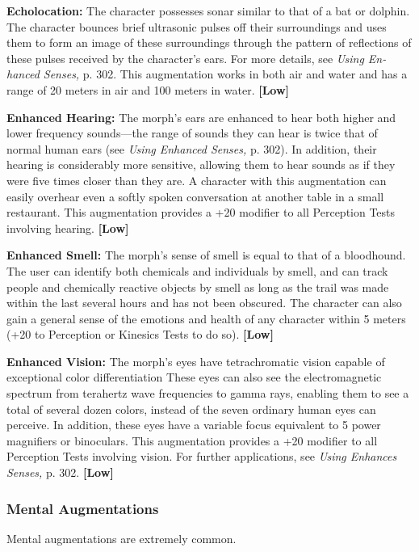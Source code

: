 \textbf{Echolocation:} The character possesses sonar similar 
to that of a bat or dolphin. The character bounces 
brief ultrasonic pulses off their surroundings and uses 
them to form an image of these surroundings through 
the pattern of reflections of these pulses received by 
the character's ears. For more details, see \textit{Using En-}
\textit{hanced Senses,} p. 302. This augmentation works in 
both air and water and has a range of 20 meters in air 
and 100 meters in water. \textbf{[Low]}

\textbf{Enhanced Hearing:} The morph's ears are enhanced 
to hear both higher and lower frequency sounds—the 
range of sounds they can hear is twice that of normal 
human ears (see \textit{Using Enhanced Senses,} p. 302). In 
addition, their hearing is considerably more sensitive, 
allowing them to hear sounds as if they were five 
times closer than they are. A character with this augmentation
can easily overhear even a softly spoken
conversation at another table in a small restaurant. 
This augmentation provides a +20 modifier to all 
Perception Tests involving hearing. \textbf{[Low]}

\textbf{Enhanced Smell:} The morph's sense of smell is 
equal to that of a bloodhound. The user can identify
both chemicals and individuals by smell, and can
track people and chemically reactive objects by smell 
as long as the trail was made within the last several 
hours and has not been obscured. The character can 
also gain a general sense of the emotions and health 
of any character within 5 meters (+20 to Perception or 
Kinesics Tests to do so). \textbf{[Low]}

\textbf{Enhanced Vision:} The morph's eyes have tetrachromatic
vision capable of exceptional color differentiation
These eyes can also see the electromagnetic
spectrum from terahertz wave frequencies to gamma 
rays, enabling them to see a total of several dozen 
colors, instead of the seven ordinary human eyes can 
perceive. In addition, these eyes have a variable focus 
equivalent to 5 power magnifiers or binoculars. This 
augmentation provides a +20 modifier to all Perception
Tests involving vision. For further applications,
see \textit{Using Enhances Senses,} p. 302. \textbf{[Low]}

\subsubsection{Mental Augmentations}

Mental augmentations are extremely common.

